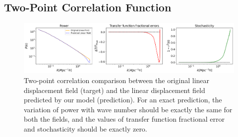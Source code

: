 \documentclass[10pt]{article}
\begin{document}
\subsection{Two-Point Correlation Function}

\begin{figure}[t!]
  \begin{center}
  \centerline{\includegraphics[width=\textwidth]{images/lin.png}}
  \caption{Two-point correlation comparison between the original linear displacement field (target) and the linear displacement field predicted by our model (prediction). For an exact prediction, the variation of power with wave number should be exactly the same for both the fields, and the values of transfer function fractional error and stochasticity should be exactly zero. }
  \label{lin}
  \end{center}
\end{figure}

\end{document}
